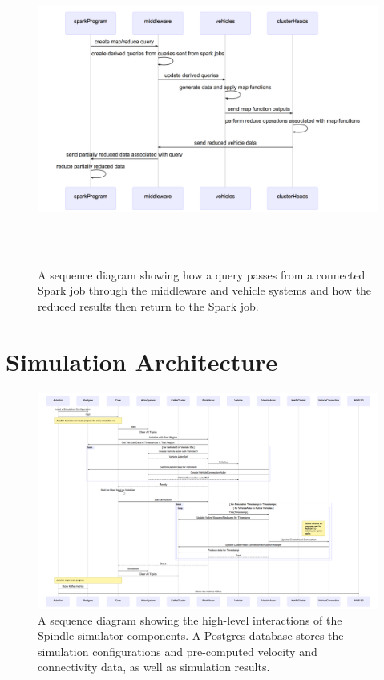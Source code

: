 \documentclass{thesis}
\begin{document}
    \begin{figure}
        \centering
        \includegraphics[height=4in, width=6in]{binImages/theoretical-sequence.png}
        \caption{A sequence diagram showing how a query passes from a connected Spark job
        through the middleware and vehicle systems and how the reduced results then return
        to the Spark job.}
        \label{fig:theoretical:sequence}
    \end{figure}

\section{Simulation Architecture}
    \begin{landscape}
        \begin{figure}
            \centering
            \includegraphics[scale=.3]{binImages/simulator-sequence.png}
            \caption{A sequence diagram showing the high-level interactions of
            the Spindle simulator components. A Postgres database stores the
            simulation configurations and pre-computed velocity and connectivity
            data, as well as simulation results.}
        \end{figure}
    \end{landscape}
\end{document}
